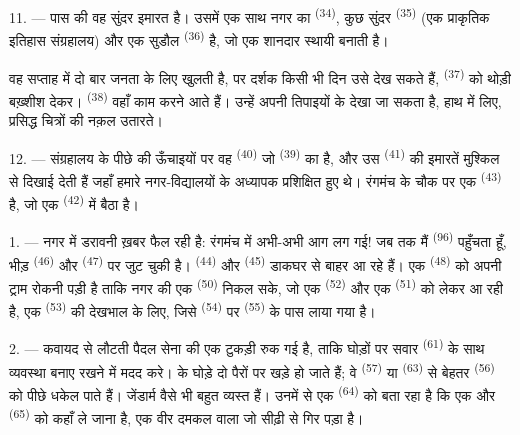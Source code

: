 11. --- पास की वह सुंदर इमारत  है। उसमें एक साथ नगर का
 \textsuperscript{(34)}, कुछ सुंदर
 \textsuperscript{(35)} (एक प्राकृतिक इतिहास
संग्रहालय) और एक सुडौल  \textsuperscript{(36)} है, जो एक शानदार
स्थायी  बनाती है।

वह सप्ताह में दो बार जनता के लिए खुलती है, पर दर्शक किसी भी दिन उसे देख सकते हैं,
 \textsuperscript{(37)} को थोड़ी बख़्शीश देकर। 
\textsuperscript{(38)} वहाँ काम करने आते हैं। उन्हें अपनी तिपाइयों के
 देखा जा सकता है, हाथ में  लिए, प्रसिद्ध चित्रों
की नक़ल उतारते।

12. --- संग्रहालय के पीछे की ऊँचाइयों पर वह 
\textsuperscript{(40)} जो  \textsuperscript{(39)} का है, और उस
 \textsuperscript{(41)} की इमारतें मुश्किल से
दिखाई देती हैं जहाँ हमारे नगर-विद्यालयों के अध्यापक प्रशिक्षित हुए थे। रंगमंच के
चौक पर एक  \textsuperscript{(43)} है, जो एक 
\textsuperscript{(42)} में बैठा है।

\VUsaut{5.0mm}
\VUsaut{3.0mm}

\VUsaut{3.4mm}

1. --- नगर में डरावनी ख़बर फैल रही है: रंगमंच में अभी-अभी आग लग गई! जब तक मैं
 \textsuperscript{(96)} पहुँचता हूँ, भीड़ 
\textsuperscript{(46)} और  \textsuperscript{(47)} पर जुट चुकी है।
 \textsuperscript{(44)} और  \textsuperscript{(45)}
डाकघर से बाहर आ रहे हैं। एक  \textsuperscript{(48)} को अपनी
ट्राम रोकनी पड़ी है ताकि नगर की एक  \textsuperscript{(50)}
निकल सके, जो एक  \textsuperscript{(52)} और एक
 \textsuperscript{(51)} को लेकर आ रही है, एक 
\textsuperscript{(53)} की देखभाल के लिए, जिसे  \textsuperscript{(54)}
पर  \textsuperscript{(55)} के पास लाया गया है।

2. --- कवायद से लौटती पैदल सेना की एक टुकड़ी रुक गई है, ताकि घोड़ों पर सवार
 \textsuperscript{(61)} के साथ व्यवस्था बनाए रखने में मदद करे।
 के घोड़े दो पैरों पर खड़े हो जाते हैं; वे 
\textsuperscript{(57)} या  \textsuperscript{(63)} से बेहतर
 \textsuperscript{(56)} को पीछे धकेल पाते हैं। जेंडार्म वैसे भी
बहुत व्यस्त हैं। उनमें से एक  \textsuperscript{(64)} को
बता रहा है कि एक और  \textsuperscript{(65)} को कहाँ ले जाना है, एक
वीर दमकल वाला जो सीढ़ी से गिर पड़ा है।

